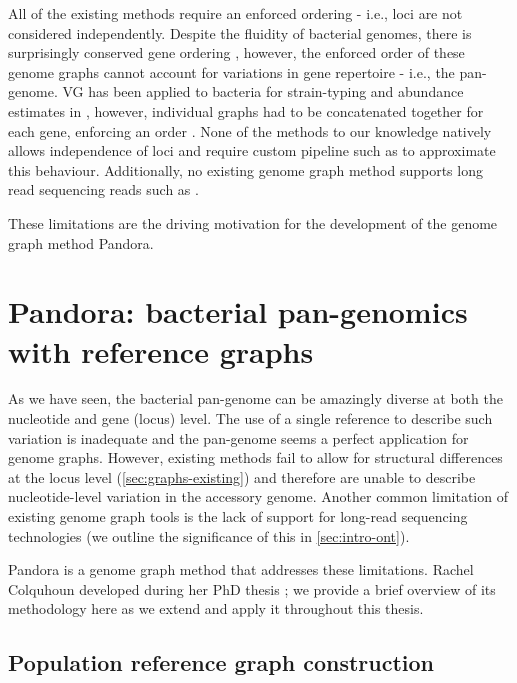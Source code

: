 \noindent
All of the existing methods require an enforced ordering - i.e., loci are not considered independently. Despite the fluidity of bacterial genomes, there is surprisingly conserved gene ordering \cite{Tamames2001,Rocha2008}, however, the enforced order of these genome graphs cannot account for variations in gene repertoire - i.e., the pan-genome. VG has been applied to bacteria for strain-typing and abundance estimates in \ecoli{}, however, individual graphs had to be concatenated together for each gene, enforcing an order \cite{strainflair2021}. None of the methods to our knowledge natively allows independence of loci and require custom pipeline such as \cite{strainflair2021} to approximate this behaviour. Additionally, no existing genome graph method supports long read sequencing reads such as \ont{}.

These limitations are the driving motivation for the development of the genome graph method Pandora.

\section{Pandora: bacterial pan-genomics with reference graphs}
\label{sec:pandora-intro}

As we have seen, the bacterial pan-genome can be amazingly diverse at both the nucleotide and gene (locus) level. The use of a single reference to describe such variation is inadequate and the pan-genome seems a perfect application for genome graphs. However, existing methods fail to allow for structural differences at the locus level (\autoref{sec:graphs-existing}) and therefore are unable to describe nucleotide-level variation in the accessory genome. Another common limitation of existing genome graph tools is the lack of support for long-read sequencing technologies (we outline the significance of this in \autoref{sec:intro-ont}).

Pandora is a genome graph method that addresses these limitations. Rachel Colquhoun developed \pandora{} during her PhD thesis \cite{rachelthesis}; we provide a brief overview of its methodology here as we extend and apply it throughout this thesis.

\subsection{Population reference graph construction}
\label{sec:make_prg}

